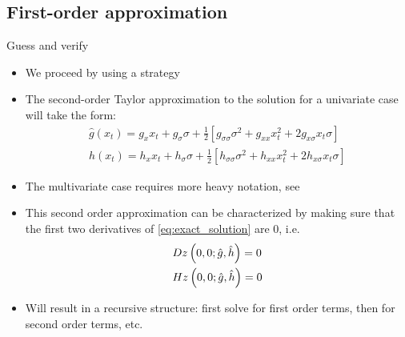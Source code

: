 \subsection{First-order approximation}
\begin{frame}{Guess and verify}
  \begin{itemize}
    \item We proceed by using a  strategy
    \item The second-order Taylor approximation to the solution for a univariate case will take the form:
          \begin{align}
            \hat g\left( {{x_t}} \right) = {g_x}{x_t} + {g_\sigma }\sigma  +\frac{1}{2}\left[ {g_{\sigma \sigma }}{\sigma ^2} + {g_{xx}}x_t^2 + 2{g_{x\sigma }}{x_t}\sigma \right] \label{eq:g_fun} \\
            \hat h\left( {{x_t}} \right) = {h_x}{x_t} + {h_\sigma }\sigma  +\frac{1}{2}\left[ {h_{\sigma \sigma }}{\sigma ^2} + {h_{xx}}x_t^2 + 2{h_{x\sigma }}{x_t}\sigma  \right] \label{eq:h_fun}
          \end{align}
    \item The multivariate case requires more heavy notation, see \textcite{GommeKlein2011}
    \item This second order approximation can be characterized by making sure that the first two derivatives of \eqref{eq:exact_solution} are 0, i.e.\
          \[\begin{gathered}
              Dz\left( {0,0;\hat g,\hat h} \right) = 0 \hfill \\
              Hz\left( {0,0;\hat g,\hat h} \right) = 0 \hfill \\
            \end{gathered} \]
    \item Will result in a recursive structure: first solve for first order terms, then for second order terms, etc.
  \end{itemize}
\end{frame}


